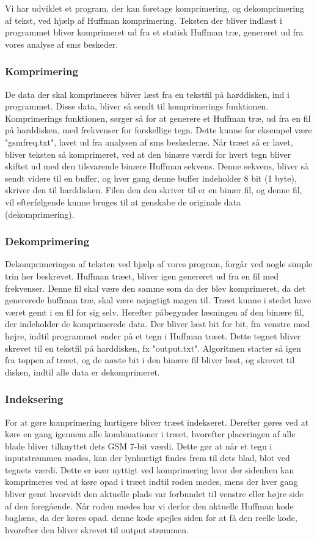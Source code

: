 Vi har udviklet et program, der kan foretage komprimering, og dekomprimering af tekst, ved hjælp af Huffman komprimering. Teksten der bliver indlæst i programmet bliver komprimeret ud fra et statisk Huffman træ, genereret ud fra vores analyse af sms beskeder.


\subsubsection{Komprimering}

De data der skal komprimeres bliver læst fra en tekstfil på harddisken, ind i programmet. Disse data, bliver så sendt til komprimerings funktionen. Komprimerings funktionen, sørger så for at generere et Huffman træ, ud fra en fil på harddisken, med frekvenser for forskellige tegn. Dette kunne for eksempel være "gsmfreq.txt", lavet ud fra analysen af sms beskederne.
Når træet så er lavet, bliver teksten så komprimeret, ved at den binære værdi for hvert tegn bliver skiftet ud med den tilsvarende binære Huffman sekvens. Denne sekvens, bliver så sendt videre til en buffer, og hver gang denne buffer indeholder 8 bit (1 byte), skriver den til harddisken. Filen den den skriver til er en binær fil, og denne fil, vil efterfølgende kunne bruges til at genskabe de originale data (dekomprimering).

\subsubsection{Dekomprimering}

Dekomprimeringen af teksten ved hjælp af vores program, forgår ved nogle simple trin her beskrevet. Huffman træet, bliver igen genereret ud fra en fil med frekvenser. Denne fil skal være den samme som da der blev komprimeret, da det genererede huffman træ, skal være nøjagtigt magen til. Træet kunne i stedet have været gemt i en fil for sig selv.
Herefter påbegynder læsningen af den binære fil, der indeholder de komprimerede data. Der bliver læst bit for bit, fra venstre mod højre, indtil programmet ender på et tegn i Huffman træet. Dette tegnet bliver skrevet til en tekstfil på harddisken, fx "output.txt". Algoritmen starter så igen fra toppen af træet, og de næste bit i den binære fil bliver læst, og skrevet til disken, indtil alle data er dekomprimeret.

\subsubsection{Indeksering}
For at gøre komprimering hurtigere bliver træet indekseret. Derefter gøres ved at køre en gang igennem alle kombinationer i træet, hvorefter placeringen af alle blade bliver tilknyttet dets GSM 7-bit værdi. Dette gør at når et tegn i inputstrømmen mødes, kan der lynhurtigt findes frem til dets blad, blot ved tegnets værdi. Dette er især nyttigt ved komprimering hvor der sidenhen kan komprimeres ved at køre opad i træet indtil roden mødes, mens der hver gang bliver gemt hvorvidt den aktuelle plads var forbundet til venstre eller højre side af den foregående. Når roden mødes har vi derfor den aktuelle Huffman kode baglæns, da der køres opad. denne kode spejles siden for at få den reelle kode, hvorefter den bliver skrevet til output strømmen.